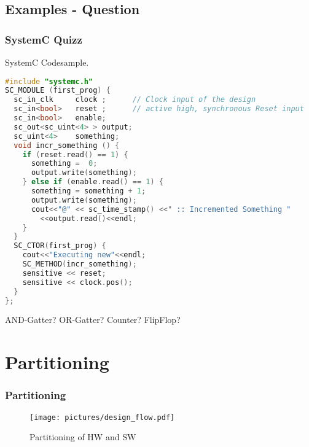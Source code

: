 \documentclass{beamer}
\begin{document}
\subsection{Examples - Question}
\begin{frame}[fragile]\frametitle{SystemC Quizz} 
SystemC Codesample.
\begin{lstlisting}[language=C++,basicstyle=\tiny]
#include "systemc.h"
SC_MODULE (first_prog) {
  sc_in_clk     clock ;      // Clock input of the design
  sc_in<bool>   reset ;      // active high, synchronous Reset input
  sc_in<bool>   enable;     
  sc_out<sc_uint<4> > output;
  sc_uint<4>	something;
  void incr_something () {
    if (reset.read() == 1) {
      something =  0;
      output.write(something);
    } else if (enable.read() == 1) {
      something = something + 1;
      output.write(something);
      cout<<"@" << sc_time_stamp() <<" :: Incremented Something "
        <<output.read()<<endl;
    }
  }
  SC_CTOR(first_prog) {
    cout<<"Executing new"<<endl;
    SC_METHOD(incr_something);
    sensitive << reset;
    sensitive << clock.pos();
  }
};
\end{lstlisting}
AND-Gatter? OR-Gatter? Counter? FlipFlop?
\end{frame}

\section{Partitioning}
\begin{frame}\frametitle{Partitioning} 
	    \begin{figure}[hp]
	      \centering
	      \texttt{[image: pictures/design\_flow.pdf]}
	      \caption{Partitioning of HW and SW \cite{braunschweig}}
	      \label{fig:flow}
	    \end{figure} 



\end{frame}
\end{document}

